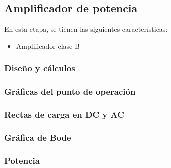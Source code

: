 \documentclass[a4paper, 12pt]{article}
\begin{document}
\newpage
\subsection{Amplificador de potencia}
En esta etapa, se tienen las siguientes características:
\begin{itemize}
    \item Amplificador clase B
\end{itemize}

\subsubsection{Diseño y cálculos}
\subsubsection{Gráficas del punto de operación}
\subsubsection{Rectas de carga en DC y AC}
\subsubsection{Gráfica de Bode}
\subsubsection{Potencia}
\end{document}
